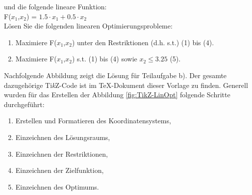 	und die folgende lineare Funktion: \\
		F($x_1$,$x_2$) = $1.5 \cdot x_1 + 0.5 \cdot x_2$  \\

	Lösen Sie die folgenden linearen Optimierungsprobleme:

		\begin{enumerate} [leftmargin=*, label= (\alph*)]
			\item Maximiere F($x_1$,$x_2$) unter den Restriktionen (d.h. s.t.) (1) bis (4).            
            \item Maximiere F($x_1$,$x_2$) s.t. (1) bis (4)  sowie $x_2 \le 3.25$ (5).\\       
		\end{enumerate}	
		
	
	
	Nachfolgende Abbildung zeigt die Lösung für Teilaufgabe b).
	Der gesamte dazugehörige Ti\textit{k}Z-Code ist im TeX-Dokument dieser Vorlage zu finden. Generell wurden für das Erstellen der Abbildung \ref{fig:TikZ-LinOpt} folgende Schritte durchgeführt:
	\begin{enumerate}
            \item Erstellen und Formatieren des Koordinatensystems,
            \item Einzeichnen des Lösungsraums,
            \item Einzeichnen der Restriktionen,
            \item Einzeichnen der Zielfunktion,
            \item Einzeichnen des Optimums.\\
    \end{enumerate}
	
	
			
